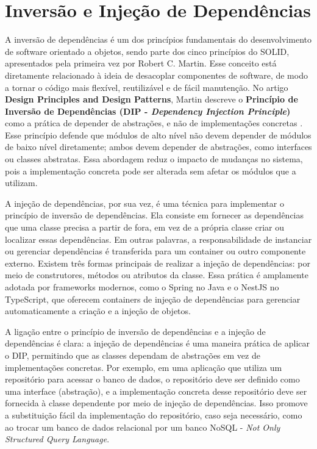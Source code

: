 \section{Inversão e Injeção de Dependências}
A inversão de dependências é um dos princípios fundamentais do desenvolvimento de software orientado a objetos, sendo parte dos cinco princípios do SOLID, apresentados pela primeira vez por Robert C. Martin. Esse conceito está diretamente relacionado à ideia de desacoplar componentes de software, de modo a tornar o código mais flexível, reutilizável e de fácil manutenção. No artigo \textbf{Design Principles and Design Patterns}, Martin descreve o \textbf{Princípio de Inversão de Dependências (DIP - \textit{Dependency Injection Principle})} como a prática de depender de abstrações, e não de implementações concretas \cite[p.~12]{martin2000design}. Esse princípio defende que módulos de alto nível não devem depender de módulos de baixo nível diretamente; ambos devem depender de abstrações, como interfaces ou classes abstratas. Essa abordagem reduz o impacto de mudanças no sistema, pois a implementação concreta pode ser alterada sem afetar os módulos que a utilizam.

A injeção de dependências, por sua vez, é uma técnica para implementar o princípio de inversão de dependências. Ela consiste em fornecer as dependências que uma classe precisa a partir de fora, em vez de a própria classe criar ou localizar essas dependências. Em outras palavras, a responsabilidade de instanciar ou gerenciar dependências é transferida para um container ou outro componente externo. Existem três formas principais de realizar a injeção de dependências: por meio de construtores, métodos ou atributos da classe. Essa prática é amplamente adotada por frameworks modernos, como o Spring no Java e o NestJS no TypeScript, que oferecem containers de injeção de dependências para gerenciar automaticamente a criação e a injeção de objetos.

A ligação entre o princípio de inversão de dependências e a injeção de dependências é clara: a injeção de dependências é uma maneira prática de aplicar o DIP, permitindo que as classes dependam de abstrações em vez de implementações concretas. Por exemplo, em uma aplicação que utiliza um repositório para acessar o banco de dados, o repositório deve ser definido como uma interface (abstração), e a implementação concreta desse repositório deve ser fornecida à classe dependente por meio de injeção de dependências. Isso promove a substituição fácil da implementação do repositório, caso seja necessário, como ao trocar um banco de dados relacional por um banco NoSQL - \textit{Not Only Structured Query Language}.

